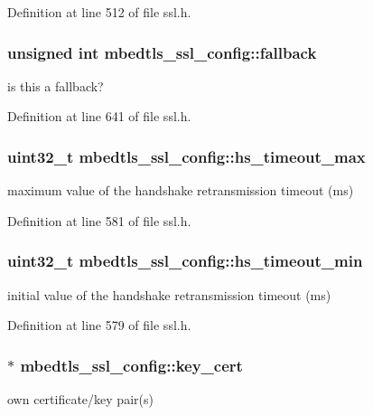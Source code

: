 Definition at line 512 of file ssl.\-h.

\hypertarget{structmbedtls__ssl__config_a0ca184f6088f938d7240157e8b4bbbab}{
\subsubsection[{fallback}]{\setlength{\rightskip}{0pt plus 5cm}unsigned int mbedtls\-\_\-ssl\-\_\-config\-::fallback}}\label{structmbedtls__ssl__config_a0ca184f6088f938d7240157e8b4bbbab}
is this a fallback? 

Definition at line 641 of file ssl.\-h.

\hypertarget{structmbedtls__ssl__config_af44d9c59c9255186e2a00f44e0678fac}{
\subsubsection[{hs\-\_\-timeout\-\_\-max}]{\setlength{\rightskip}{0pt plus 5cm}uint32\-\_\-t mbedtls\-\_\-ssl\-\_\-config\-::hs\-\_\-timeout\-\_\-max}}\label{structmbedtls__ssl__config_af44d9c59c9255186e2a00f44e0678fac}
maximum value of the handshake retransmission timeout (ms) 

Definition at line 581 of file ssl.\-h.

\hypertarget{structmbedtls__ssl__config_a28320f7be718c8f4197ee146dfdc2447}{
\subsubsection[{hs\-\_\-timeout\-\_\-min}]{\setlength{\rightskip}{0pt plus 5cm}uint32\-\_\-t mbedtls\-\_\-ssl\-\_\-config\-::hs\-\_\-timeout\-\_\-min}}\label{structmbedtls__ssl__config_a28320f7be718c8f4197ee146dfdc2447}
initial value of the handshake retransmission timeout (ms) 

Definition at line 579 of file ssl.\-h.

\hypertarget{structmbedtls__ssl__config_afbcfe1cdb3e42ee1d1e14352cefde29e}{
\subsubsection[{key\-\_\-cert}]{$\ast$ mbedtls\-\_\-ssl\-\_\-config\-::key\-\_\-cert}}\label{structmbedtls__ssl__config_afbcfe1cdb3e42ee1d1e14352cefde29e}
own certificate/key pair(s) 

